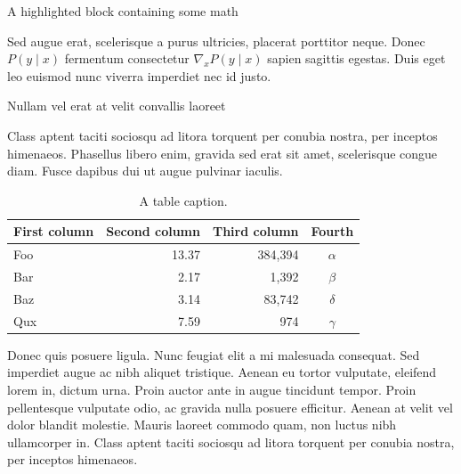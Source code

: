 \documentclass[final]{beamer}
\newlength{\colwidth}
\begin{document}
\begin{frame}[t]
\begin{columns}[t]
\begin{column}{\colwidth}
\begin{exampleblock}{A highlighted block containing some math}

    Sed augue erat, scelerisque a purus ultricies, placerat porttitor neque.
    Donec $P(y \mid x)$ fermentum consectetur $\nabla_x P(y \mid x)$ sapien
    sagittis egestas. Duis eget leo euismod nunc viverra imperdiet nec id
    justo.

  \end{exampleblock}

  \begin{block}{Nullam vel erat at velit convallis laoreet}

    Class aptent taciti sociosqu ad litora torquent per conubia nostra, per
    inceptos himenaeos. Phasellus libero enim, gravida sed erat sit amet,
    scelerisque congue diam. Fusce dapibus dui ut augue pulvinar iaculis.

    \begin{table}
      \centering
      \begin{tabular}{l r r c}
        \toprule
        \textbf{First column} & \textbf{Second column} & \textbf{Third column} & \textbf{Fourth} \\
        \midrule
        Foo & 13.37 & 384,394 & $\alpha$ \\
        Bar & 2.17 & 1,392 & $\beta$ \\
        Baz & 3.14 & 83,742 & $\delta$ \\
        Qux & 7.59 & 974 & $\gamma$ \\
        \bottomrule
      \end{tabular}
      \caption{A table caption.}
    \end{table}

    Donec quis posuere ligula. Nunc feugiat elit a mi malesuada consequat. Sed
    imperdiet augue ac nibh aliquet tristique. Aenean eu tortor vulputate,
    eleifend lorem in, dictum urna. Proin auctor ante in augue tincidunt
    tempor. Proin pellentesque vulputate odio, ac gravida nulla posuere
    efficitur. Aenean at velit vel dolor blandit molestie. Mauris laoreet
    commodo quam, non luctus nibh ullamcorper in. Class aptent taciti sociosqu
    ad litora torquent per conubia nostra, per inceptos himenaeos.


\end{block}
\end{column}
\end{columns}
\end{frame}
\end{document}

